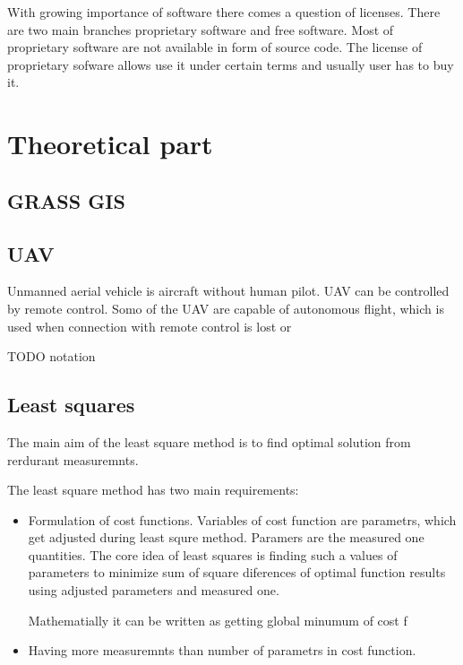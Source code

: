 \documentclass[a4paper,12pt]{report}
\begin{document}
With growing importance of software there comes a question of licenses. There are two 
main branches proprietary software and free software. Most of proprietary software are not available in 
form of source code. The license of proprietary sofware allows use it under certain terms and usually user 
has to buy it.


\newpage

\chapter{Theoretical part}


\section{GRASS GIS}

\section{UAV}

Unmanned aerial vehicle is aircraft without human pilot. UAV can be controlled by remote control.
Somo of the UAV are capable of autonomous flight, which is used when connection with remote control is 
lost or 

TODO notation

\section{Least squares}
\label{sec:least}


The main aim of the least square method is to find optimal solution from rerdurant measuremnts.


The least square method has two main requirements:
\begin{itemize}
\item Formulation of cost functions. Variables of cost function are parametrs, which get adjusted 
      during least squre method. Paramers are the measured one quantities.
      The core idea of least squares is finding such a values of parameters to minimize sum 
      of square diferences of optimal function results using adjusted parameters and measured one.
      
      Mathematially it can be written as getting global minumum of cost f 
      
\item Having more measuremnts than number of parametrs in cost function.

\end{itemize}
\end{document}
